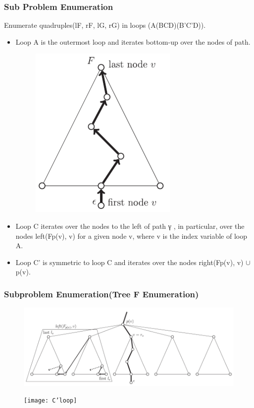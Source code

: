 \documentclass{beamer}
\begin{document}
\begin{frame}
\frametitle{Sub Problem Enumeration}
Enumerate quadruples(lF, rF, lG, rG) in loops (A(BCD)(B'C'D)).
\begin{itemize}
\item Loop A is the outermost loop and iterates bottom-up over the nodes of path.
\begin{figure}
	\includegraphics[width=0.2\linewidth]{Aloop}
	\label{Aloop} 
	\centering
\end{figure}
\item Loop C iterates over the nodes to the left of path γ , in particular, over the nodes
left(Fp(v), v) for a given node v, where v is the index variable of loop A.
\item Loop C' is symmetric to loop C and iterates over the nodes right(Fp(v), v) $\cup$ {p(v)}.
\end{itemize}
\end{frame}

\begin{frame}
\frametitle{Subproblem Enumeration(Tree F Enumeration)}
\begin{figure}
	\includegraphics[width=0.8\linewidth]{Cloop}
	\label{Cloop} 
	\centering
\end{figure}
\begin{figure}
	\texttt{[image: C'loop]}
	\label{C'loop} 
	\centering
\end{figure}
\end{frame}
\end{document}
